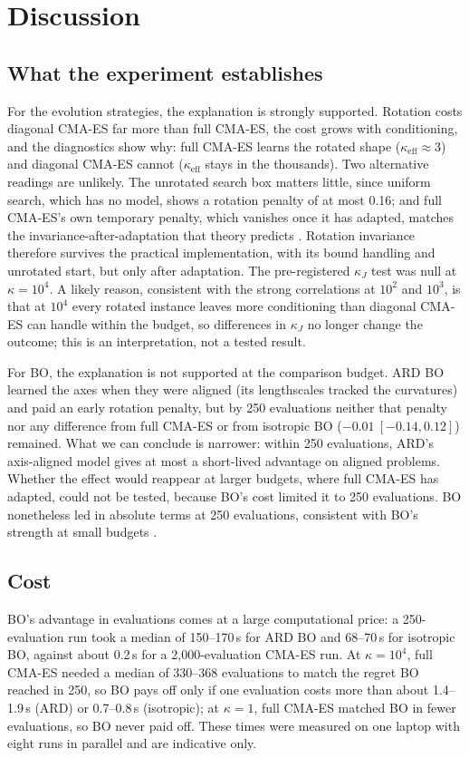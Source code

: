 \documentclass[12pt]{article}
\begin{document}
\section{Discussion}
\label{sec:discussion}
\subsection{What the experiment establishes}
For the evolution strategies, the explanation is strongly supported. Rotation costs diagonal CMA-ES far more than full CMA-ES, the cost grows with conditioning, and the diagnostics show why: full CMA-ES learns the rotated shape ($\kappa_{\mathrm{eff}}\approx 3$) and diagonal CMA-ES cannot ($\kappa_{\mathrm{eff}}$ stays in the thousands). Two alternative readings are unlikely. The unrotated search box matters little, since uniform search, which has no model, shows a rotation penalty of at most 0.16; and full CMA-ES's own temporary penalty, which vanishes once it has adapted, matches the invariance-after-adaptation that theory predicts \parencite[p.~24]{hansen2023tutorial}. Rotation invariance therefore survives the practical implementation, with its bound handling and unrotated start, but only after adaptation. The pre-registered $\kappa_J$ test was null at $\kappa=10^4$. A likely reason, consistent with the strong correlations at $10^2$ and $10^3$, is that at $10^4$ every rotated instance leaves more conditioning than diagonal CMA-ES can handle within the budget, so differences in $\kappa_J$ no longer change the outcome; this is an interpretation, not a tested result.

For BO, the explanation is not supported at the comparison budget. ARD BO learned the axes when they were aligned (its lengthscales tracked the curvatures) and paid an early rotation penalty, but by 250 evaluations neither that penalty nor any difference from full CMA-ES or from isotropic BO ($-0.01\ [-0.14, 0.12]$) remained. What we can conclude is narrower: within 250 evaluations, ARD's axis-aligned model gives at most a short-lived advantage on aligned problems. Whether the effect would reappear at larger budgets, where full CMA-ES has adapted, could not be tested, because BO's cost limited it to 250 evaluations. BO nonetheless led in absolute terms at 250 evaluations, consistent with BO's strength at small budgets \parencite{raponi2023low}.

\subsection{Cost}
BO's advantage in evaluations comes at a large computational price: a 250-evaluation run took a median of 150--170\,s for ARD BO and 68--70\,s for isotropic BO, against about 0.2\,s for a 2{,}000-evaluation CMA-ES run. At $\kappa=10^4$, full CMA-ES needed a median of 330--368 evaluations to match the regret BO reached in 250, so BO pays off only if one evaluation costs more than about 1.4--1.9\,s (ARD) or 0.7--0.8\,s (isotropic); at $\kappa=1$, full CMA-ES matched BO in fewer evaluations, so BO never paid off. These times were measured on one laptop with eight runs in parallel and are indicative only.
\end{document}
